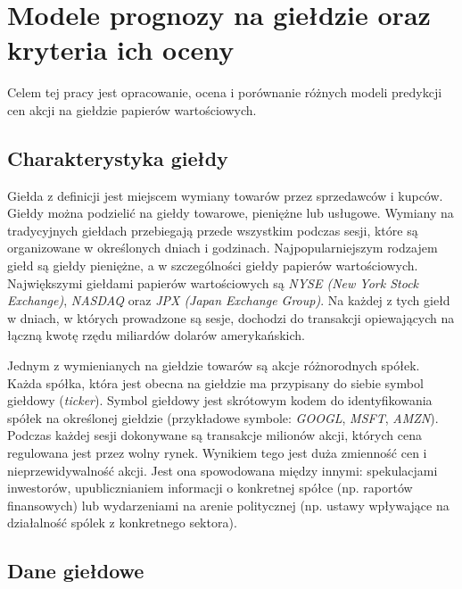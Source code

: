 \documentclass[a4paper, twoside, 11pt, openright]{article}
\newcommand{\fncymain}{%
	\fancyhead[RO]{{\footnotesize \rightmark}}
	\fancyfoot[RO]{\thepage}
	\fancyhead[LE]{{\footnotesize \leftmark}}
	\fancyfoot[LE]{\thepage}
	\fancyfoot[C]{}
	\renewcommand{\headrulewidth}{0.3pt}}
\begin{document}
\fncymain



\cleardoublepage

\tableofcontents

\cleardoublepage

\section{Modele prognozy na giełdzie oraz kryteria ich oceny}

Celem tej pracy jest opracowanie, ocena i porównanie różnych modeli predykcji cen akcji na giełdzie papierów wartościowych.

\subsection{Charakterystyka giełdy}

Giełda z definicji jest miejscem wymiany towarów przez sprzedawców i kupców. Giełdy można podzielić na giełdy towarowe, pieniężne lub usługowe. Wymiany na tradycyjnych giełdach przebiegają przede wszystkim podczas sesji, które są organizowane w określonych dniach i godzinach. Najpopularniejszym rodzajem giełd są giełdy pieniężne, a w szczególności giełdy papierów wartościowych. Największymi giełdami papierów wartościowych są \textit{NYSE (New York Stock Exchange)}\cite{nyse}, \textit{NASDAQ}\cite{nasdaq} oraz \textit{JPX (Japan Exchange Group)}\cite{jpx}. Na każdej z tych giełd w dniach, w których prowadzone są sesje, dochodzi do transakcji opiewających na łączną kwotę rzędu miliardów dolarów amerykańskich.

\bigskip

 Jednym z wymienianych na giełdzie towarów są akcje różnorodnych spółek. Każda spółka, która jest obecna na giełdzie ma przypisany do siebie symbol giełdowy (\textit{ticker}). Symbol giełdowy jest skrótowym kodem do identyfikowania spółek na określonej giełdzie (przykładowe symbole: \textit{GOOGL}, \textit{MSFT}, \textit{AMZN}). Podczas każdej sesji dokonywane są transakcje milionów akcji, których cena regulowana jest przez wolny rynek. Wynikiem tego jest duża zmienność cen i nieprzewidywalność akcji. Jest ona spowodowana między innymi: spekulacjami inwestorów, upublicznianiem informacji o konkretnej spółce (np. raportów finansowych) lub wydarzeniami na arenie politycznej (np. ustawy wpływające na działalność spólek z konkretnego sektora).


\subsection{Dane giełdowe}
\end{document}
